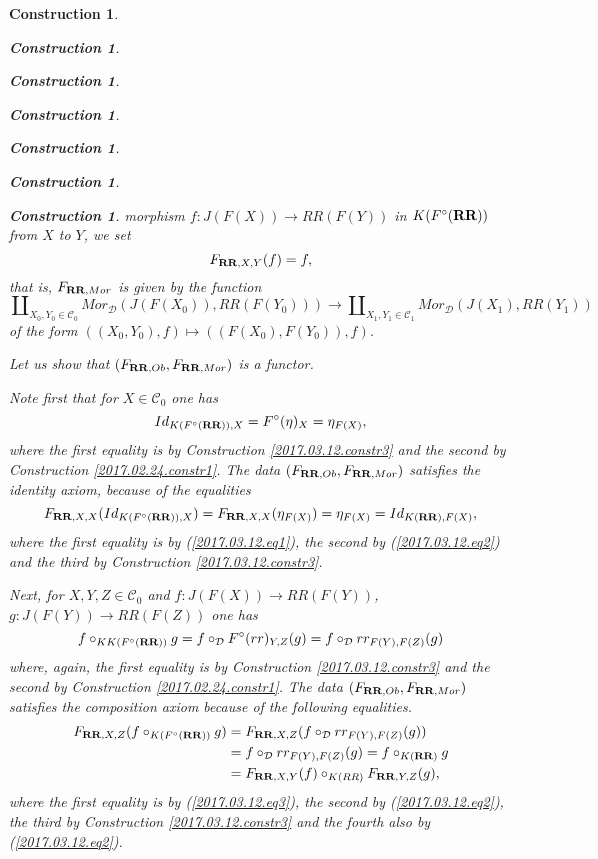 \documentclass[onecolumn,12pt]{amsart}
\numberwithin{proposition}{subsection}
\newtheorem{construction}[proposition]{Construction}
\newcommand{\sr}{\rightarrow}
\newcommand{\RR}{{\bf RR}}
\newcommand{\C}{{\mathcal C}}
\newcommand{\D}{{\mathcal D}}
\begin{document}
\begin{construction}
\begin{construction}
\begin{construction}
\begin{construction}
\begin{construction}
\begin{construction}
\begin{construction}
morphism $f:J(F(X))\sr RR(F(Y))$ in $K(F^{\circ}(\RR))$ from $X$ to $Y$, we set
%
\begin{equation}
\label{2017.03.12.eq2}
F_{\RR,X,Y}(f)=f,
\end{equation}%
%
that is, $F_{\RR,Mor}$ is given by the function
%
$$\amalg_{X_0,Y_0\in\C_0}Mor_{\D}(J(F(X_0)),RR(F(Y_0)))\sr \amalg_{X_1,Y_1\in\C_1}Mor_{\D}(J(X_1),RR(Y_1))$$
%
of the form $((X_0,Y_0),f)\mapsto ((F(X_0),F(Y_0)),f)$. 

Let us show that $(F_{\RR,Ob},F_{\RR,Mor})$ is a functor. 

Note first that for $X\in\C_0$ one has
%
\begin{equation}
\label{2017.03.12.eq1}
Id_{K(F^{\circ}(\RR)),X}=F^{\circ}(\eta)_{X}=\eta_{F(X)},
\end{equation}%
%
where the first equality is by Construction \ref{2017.03.12.constr3} and the
second by Construction \ref{2017.02.24.constr1}. The data
$(F_{\RR,Ob},F_{\RR,Mor})$ satisfies the identity axiom, because of the
equalities
%
$$F_{\RR,X,X}(Id_{K(F^{\circ}(\RR)),X})=F_{\RR,X,X}(\eta_{F(X)})=\eta_{F(X)}=Id_{K(\RR),F(X)},$$
%
where the first equality is by (\ref{2017.03.12.eq1}), the second by (\ref{2017.03.12.eq2}) and the third by Construction \ref{2017.03.12.constr3}. 

Next, for $X,Y,Z\in \C_0$ and $f:J(F(X))\sr RR(F(Y))$, $g:J(F(Y))\sr RR(F(Z))$ one has
%
\begin{equation}
\label{2017.03.12.eq3}
f\circ_{KK(F^{\circ}(\RR))} g= f\circ_{\D} F^{\circ}(rr)_{Y,Z}(g)=f\circ_{\D} rr_{F(Y),F(Z)}(g)
\end{equation}%
%
where, again, the first equality is by Construction \ref{2017.03.12.constr3}
and the second by Construction \ref{2017.02.24.constr1}. The data
$(F_{\RR,Ob},F_{\RR,Mor})$ satisfies the composition axiom because of the
following equalities.
%
\begin{equation*}
  \begin{split}
    F_{\RR,X,Z}(f\circ_{K(F^{\circ}(\RR))} g)&=F_{\RR,X,Z}(f\circ_{\D} rr_{F(Y),F(Z)}(g)) \\
    &=f\circ_{\D} rr_{F(Y),F(Z)}(g)=f\circ_{K(\RR)}g \\
    &=F_{\RR,X,Y}(f)\circ_{K(RR)}F_{\RR,Y,Z}(g),
  \end{split}
\end{equation*}
%
where the first equality is by (\ref{2017.03.12.eq3}), the second by (\ref{2017.03.12.eq2}), the third by Construction \ref{2017.03.12.constr3} and the fourth also by (\ref{2017.03.12.eq2}). 


\end{construction}
\end{construction}
\end{construction}
\end{construction}
\end{construction}
\end{construction}
\end{construction}
\end{document}
